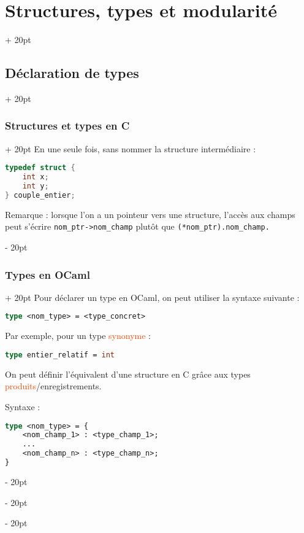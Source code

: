 \documentclass[a4paper, 12pt, twoside]{article}
\renewcommand{\emph}{\textcolor{ff4500}}
\newcommand{\ind}[1][20pt]{\advance\leftskip + #1}
\newcommand{\deind}[1][20pt]{\advance\leftskip - #1}
\newenvironment{indt}[2][20pt]{#2 \par \ind[#1]}{\par \deind} %
\begin{document}
\begin{indt}{\section{Structures, types et modularité}}
\begin{indt}{\subsection{Déclaration de types}}
\begin{indt}{\subsubsection{Structures et types en C}}
                En une seule fois, sans nommer la structure intermédiaire :
                
                \begin{lstlisting}[language=C, xleftmargin=80pt]
typedef struct {
    int x;
    int y;
} couple_entier;\end{lstlisting}
                
                \vspace{6pt}
                
                Remarque : lorsque l’on a un pointeur vers une structure, l’accès aux champs peut s’écrire \texttt{nom\_ptr->nom\_champ} plutôt que \texttt{(*nom\_ptr).nom\_champ.}
            \end{indt}
            
            \begin{indt}{\subsubsection{Types en OCaml}}
                Pour déclarer un type en OCaml, on peut utiliser la syntaxe suivante :
                \begin{lstlisting}[language=Caml, xleftmargin=80pt]
type <nom_type> = <type_concret>\end{lstlisting}
                
                \vspace{6pt}
                
                Par exemple, pour un type \emph{synonyme} :
                \begin{lstlisting}[language=Caml, xleftmargin=80pt]
type entier_relatif = int\end{lstlisting}
                
                \vspace{6pt}
                
                On peut définir l’équivalent d’une structure en C grâce aux types \emph{produits}/enregistrements.
                
                Syntaxe :
                \begin{lstlisting}[language=Caml, xleftmargin=80pt]
type <nom_type> = {
    <nom_champ_1> : <type_champ_1>;
    ...
    <nom_champ_n> : <type_champ_n>;
}\end{lstlisting}
                
                \vspace{6pt}
                

\end{indt}
\end{indt}
\end{indt}
\end{document}

